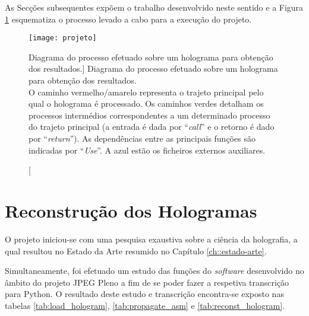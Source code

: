 As Secções subsequentes expõem o trabalho desenvolvido neste sentido e a Figura \ref{fig:projeto} esquematiza o processo levado a cabo para a execução do projeto.

\begin{figure}[!htbp]
    \centering
    \texttt{[image: projeto]}
    \caption
        [Diagrama do processo efetuado sobre um holograma para obtenção dos resultados.]
        {
            Diagrama do processo efetuado sobre um holograma para obtenção dos resultados.\\
            O caminho vermelho/amarelo representa o trajeto principal pelo qual o holograma é processado. Os caminhos verdes detalham os processos intermédios correspondentes a um determinado processo do trajeto principal (a entrada é dada por ``\textit{call}'' e o retorno é dado por ``\textit{return}''). As dependências entre as principais funções são indicadas por ``\textit{Use}''. A azul estão os ficheiros externos auxiliares. \\
        }
    \label{fig:projeto}
\end{figure}


\section{Reconstrução dos Hologramas}
\label{sec::imp-test:reconst-hologram}

O projeto iniciou-se com uma pesquisa exaustiva sobre a ciência da holografia, a qual resultou no Estado da Arte resumido no Capítulo \ref{ch::estado-arte}.

Simultaneamente, foi efetuado um estudo das funções do \textit{software} desenvolvido no âmbito do projeto JPEG Pleno a fim de se poder fazer a respetiva transcrição para Python. O resultado deste estudo e transcrição encontra-se exposto nas tabelas \ref{tab:load_hologram}, \ref{tab:propagate_asm} e \ref{tab:reconst_hologram}.

